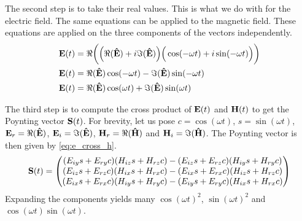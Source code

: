 The second step is to take their real values.
This is what we do with  for the electric field.
The same equations can be applied to the magnetic field.
These equations are applied on the three components of the vectors independently.
\begin{subequations}
\begin{align}
    \mathbf{E}(t) &= \Re
    \bigg(
        \Big(
            \Re(\mathbf{\hat{E}}) + i \Im(\mathbf{\hat{E}})
        \Big)
        \Big(
            \cos(- \omega t) + i \sin(- \omega t)
        \Big)
    \bigg)
    \label{eq:e_time_real_0}
    \\
    \mathbf{E}(t) &= \Re(\mathbf{\hat{E}}) \cos(- \omega t)
            -
            \Im(\mathbf{\hat{E}}) \sin(- \omega t)
    \label{eq:e_time_real_1}
    \\
    \mathbf{E}(t) &= \Re(\mathbf{\hat{E}}) \cos(\omega t)
            +
            \Im(\mathbf{\hat{E}}) \sin(\omega t)
    \label{eq:e_time_real_2}
\end{align}
    \label{eq:e_time_real}
\end{subequations}

The third step is to compute the cross product of $\mathbf{E}(t)$ and $\mathbf{H}(t)$ to get the Poynting vector $\mathbf{S}(t)$.
For brevity, let us pose $c=\cos(\omega t)$, $s=\sin(\omega t)$,
$\mathbf{E}_r = \Re(\mathbf{\hat{E}})$, $\mathbf{E}_i = \Im(\mathbf{\hat{E}})$,
$\mathbf{H}_r = \Re(\mathbf{\hat{H}})$ and $\mathbf{H}_i = \Im(\mathbf{\hat{H}})$.
The Poynting vector is then given by \cref{eq:e_cross_h}.
\begin{equation}
    \mathbf{S}(t)
    =
    \begin{pmatrix}
         (E_{iy} s + E_{ry} c) (H_{iz} s + H_{rz} c) -
         (E_{iz} s + E_{rz} c) (H_{iy} s + H_{ry} c)
         \\
         (E_{iz} s + E_{rz} c) (H_{ix} s + H_{rx} c) -
         (E_{ix} s + E_{rx} c) (H_{iz} s + H_{rz} c)
         \\
         (E_{ix} s + E_{rx} c) (H_{iy} s + H_{ry} c) -
         (E_{iy} s + E_{ry} c) (H_{ix} s + H_{rx} c)
    \end{pmatrix}
    \label{eq:e_cross_h}
\end{equation}
Expanding the components yields many $\cos(\omega t)^2$, $\sin(\omega t)^2$ and $\cos(\omega t)\sin(\omega t)$.

